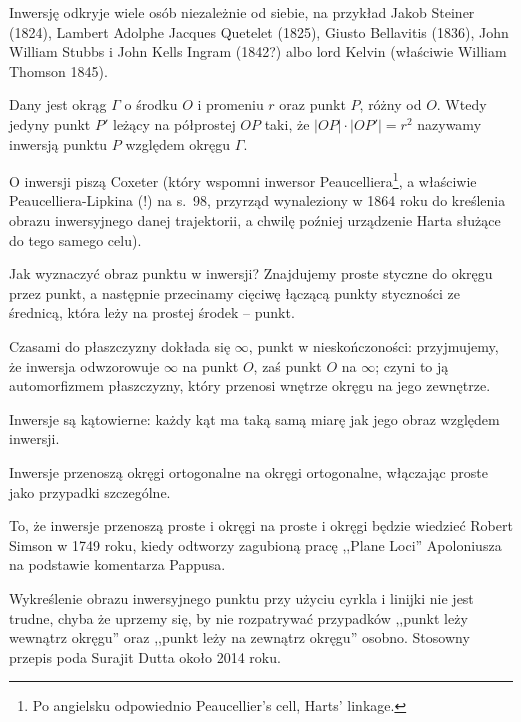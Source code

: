Inwersję odkryje wiele osób niezależnie od siebie, na przykład Jakob Steiner (1824), Lambert Adolphe Jacques Quetelet (1825), Giusto Bellavitis (1836), John William Stubbs i John Kells Ingram (1842?) albo lord Kelvin (właściwie William Thomson 1845).

\begin{definition}
    Dany jest okrąg $\Gamma$ o środku $O$ i promeniu $r$ oraz punkt $P$, różny od $O$.
    Wtedy jedyny punkt $P'$ leżący na półprostej $OP$ taki, że $|OP| \cdot |OP'| = r^2$ nazywamy inwersją punktu $P$ względem okręgu $\Gamma$.
\end{definition}

O inwersji piszą Coxeter \cite[s. 93-101, 107-112]{coxeter_1967} (który wspomni inwersor Peaucelliera\footnote{Po angielsku odpowiednio Peaucellier's cell, Harts' linkage.}, a właściwie Peaucelliera-Lipkina (!) na s.~98, przyrząd wynaleziony w 1864 roku do kreślenia obrazu inwersyjnego danej trajektorii, a chwilę poźniej urządzenie Harta służące do tego samego celu). %

Jak wyznaczyć obraz punktu w inwersji?
Znajdujemy proste styczne do okręgu przez punkt, a następnie przecinamy cięciwę łączącą punkty styczności ze średnicą, która leży na prostej środek -- punkt. %

Czasami do płaszczyzny dokłada się $\infty$, punkt w nieskończoności: przyjmujemy, że inwersja odwzorowuje $\infty$ na punkt $O$, zaś punkt $O$ na $\infty$; czyni to ją automorfizmem płaszczyzny, który przenosi wnętrze okręgu na jego zewnętrze.

\begin{proposition}
    Inwersje są kątowierne: każdy kąt ma taką samą miarę jak jego obraz względem inwersji.
\end{proposition}

\begin{proposition}
    Inwersje przenoszą okręgi ortogonalne na okręgi ortogonalne, włączając proste jako przypadki szczególne.
\end{proposition}

To, że inwersje przenoszą proste i okręgi na proste i okręgi będzie wiedzieć Robert Simson w 1749 roku, kiedy odtworzy zagubioną pracę ,,Plane Loci'' Apoloniusza na podstawie komentarza Pappusa.

Wykreślenie obrazu inwersyjnego punktu przy użyciu cyrkla i linijki nie jest trudne, chyba że uprzemy się, by nie rozpatrywać przypadków ,,punkt leży wewnątrz okręgu'' oraz ,,punkt leży na zewnątrz okręgu'' osobno.
Stosowny przepis poda Surajit Dutta około 2014 roku.
%


